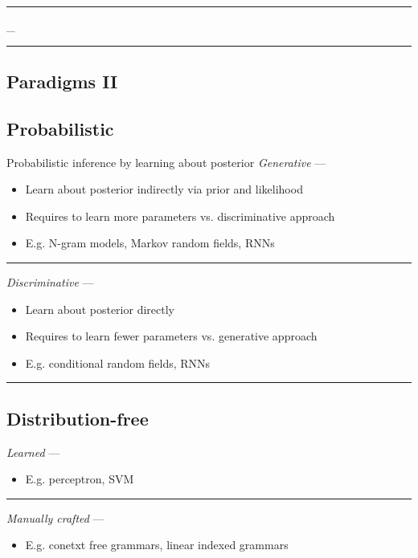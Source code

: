 {\color{black}\hrule height 0.001mm}
_
{\color{black}\hrule height 0.001mm}

\subsection*{Paradigms II}
\subsection*{Probabilistic}
Probabilistic inference by learning about posterior
\emph{Generative} --- 
\begin{itemize}
    \item Learn about posterior indirectly via prior and likelihood
    \item Requires to learn more parameters vs. discriminative approach
    \item E.g. N-gram models, Markov random fields, RNNs
\end{itemize}

{\color{lightgray}\hrule height 0.001mm}

\emph{Discriminative} --- 
\begin{itemize}
    \item Learn about posterior directly
    \item Requires to learn fewer parameters vs. generative approach
    \item E.g. conditional random fields, RNNs
\end{itemize}

{\color{black}\hrule height 0.001mm}

\subsection*{Distribution-free}
\emph{Learned} --- 
\begin{itemize}
    \item E.g. perceptron, SVM
\end{itemize}

{\color{lightgray}\hrule height 0.001mm}

\emph{Manually crafted} --- 
\begin{itemize}
    \item E.g. conetxt free grammars, linear indexed grammars
\end{itemize}